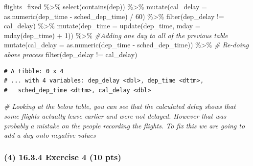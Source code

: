 \documentclass[
]{article}
\newenvironment{Shaded}{\begin{snugshade}}{\end{snugshade}}
\newcommand{\AttributeTok}[1]{\textcolor[rgb]{0.77,0.63,0.00}{#1}}
\newcommand{\CommentTok}[1]{\textcolor[rgb]{0.56,0.35,0.01}{\textit{#1}}}
\newcommand{\DecValTok}[1]{\textcolor[rgb]{0.00,0.00,0.81}{#1}}
\newcommand{\FunctionTok}[1]{\textcolor[rgb]{0.00,0.00,0.00}{#1}}
\newcommand{\NormalTok}[1]{#1}
\newcommand{\SpecialCharTok}[1]{\textcolor[rgb]{0.00,0.00,0.00}{#1}}
\newcommand{\StringTok}[1]{\textcolor[rgb]{0.31,0.60,0.02}{#1}}
\begin{document}
\begin{Shaded}
\begin{Highlighting}[]
\NormalTok{flights\_fixed }\SpecialCharTok{\%\textgreater{}\%} \FunctionTok{select}\NormalTok{(}\FunctionTok{contains}\NormalTok{(}\StringTok{\textquotesingle{}dep\textquotesingle{}}\NormalTok{)) }\SpecialCharTok{\%\textgreater{}\%}
  \FunctionTok{mutate}\NormalTok{(}\AttributeTok{cal\_delay =} \FunctionTok{as.numeric}\NormalTok{(dep\_time }\SpecialCharTok{{-}}\NormalTok{ sched\_dep\_time) }\SpecialCharTok{/} \DecValTok{60}\NormalTok{) }\SpecialCharTok{\%\textgreater{}\%}
  \FunctionTok{filter}\NormalTok{(dep\_delay }\SpecialCharTok{!=}\NormalTok{ cal\_delay) }\SpecialCharTok{\%\textgreater{}\%}
  \FunctionTok{mutate}\NormalTok{(}\AttributeTok{dep\_time =} \FunctionTok{update}\NormalTok{(dep\_time, }\AttributeTok{mday =} \FunctionTok{mday}\NormalTok{(dep\_time) }\SpecialCharTok{+} \DecValTok{1}\NormalTok{)) }\SpecialCharTok{\%\textgreater{}\%} \CommentTok{\#Adding one day to all of the previous table}
  \FunctionTok{mutate}\NormalTok{(}\AttributeTok{cal\_delay =} \FunctionTok{as.numeric}\NormalTok{(dep\_time }\SpecialCharTok{{-}}\NormalTok{ sched\_dep\_time)) }\SpecialCharTok{\%\textgreater{}\%} \CommentTok{\# Re{-}doing above process}
  \FunctionTok{filter}\NormalTok{(dep\_delay }\SpecialCharTok{!=}\NormalTok{ cal\_delay)}
\end{Highlighting}
\end{Shaded}

\begin{verbatim}
# A tibble: 0 x 4
# ... with 4 variables: dep_delay <dbl>, dep_time <dttm>,
#   sched_dep_time <dttm>, cal_delay <dbl>
\end{verbatim}

\begin{Shaded}
\begin{Highlighting}[]
\CommentTok{\# Looking at the below table, you can see that the calculated delay shows that some flights actually leave earlier and were not delayed. However that was probably a mistake on the people recording the flights. To fix this we are going to add a day onto negative values}
\end{Highlighting}
\end{Shaded}

\hypertarget{exercise-4-10-pts}{%
\subsubsection{(4) 16.3.4 Exercise 4 (10 pts)}\label{exercise-4-10-pts}}
\end{document}
